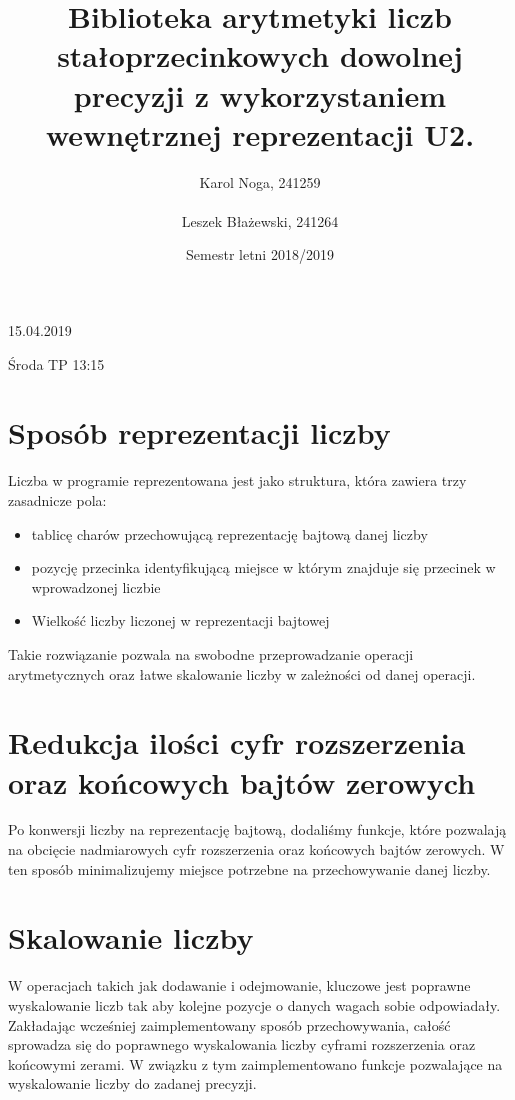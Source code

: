\documentclass[a4paper]{article}
\title{Biblioteka arytmetyki liczb stałoprzecinkowych dowolnej precyzji z wykorzystaniem wewnętrznej reprezentacji U2.}
\author{Karol Noga, 241259 \\ \\Leszek Błażewski, 241264}
\date{Semestr letni 2018/2019}
\begin{document}
\maketitle
\vspace{1mm}
{\centering \Large{15.04.2019}\par}
\vspace{1mm}
{\centering \Large{Środa TP 13:15}\par}
\clearpage
\section{Sposób reprezentacji liczby}

Liczba w programie reprezentowana jest jako struktura, która zawiera trzy zasadnicze pola:

\begin{itemize}
    \item tablicę charów przechowującą reprezentację bajtową danej liczby
    \item pozycję przecinka identyfikującą miejsce w którym znajduje się przecinek w wprowadzonej liczbie
    \item Wielkość liczby liczonej w reprezentacji bajtowej
\end{itemize}


Takie rozwiązanie pozwala na swobodne przeprowadzanie operacji arytmetycznych oraz łatwe skalowanie liczby w zależności od danej operacji.

\section{Redukcja ilości cyfr rozszerzenia oraz końcowych \newline bajtów zerowych}

Po konwersji liczby na reprezentację bajtową, dodaliśmy funkcje, które pozwalają na obcięcie nadmiarowych cyfr rozszerzenia oraz końcowych bajtów zerowych. W ten sposób minimalizujemy miejsce potrzebne na przechowywanie danej liczby.
 
\section{Skalowanie liczby}

W operacjach takich jak dodawanie i odejmowanie, kluczowe jest poprawne wyskalowanie liczb tak aby kolejne pozycje o danych wagach sobie odpowiadały. Zakładając wcześniej zaimplementowany sposób przechowywania, całość sprowadza się do poprawnego wyskalowania liczby cyframi rozszerzenia oraz końcowymi zerami. W związku z tym zaimplementowano funkcje pozwalające na wyskalowanie liczby do zadanej precyzji.
\end{document}
